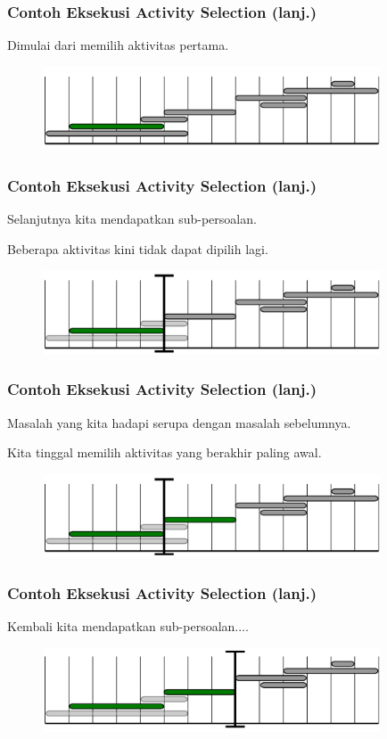 \begin{frame}
  \frametitle{Contoh Eksekusi Activity Selection (lanj.)}
  Dimulai dari memilih aktivitas pertama.
  \begin{figure}
    \includegraphics[width=10cm]{asset/activity-selection-algo-2.pdf}
  \end{figure}
\end{frame}

\begin{frame}
  \frametitle{Contoh Eksekusi Activity Selection (lanj.)}
  Selanjutnya kita mendapatkan sub-persoalan.

  Beberapa aktivitas kini tidak dapat dipilih lagi.
  \begin{figure}
    \includegraphics[width=10cm]{asset/activity-selection-algo-3.pdf}
  \end{figure}
\end{frame}

\begin{frame}
  \frametitle{Contoh Eksekusi Activity Selection (lanj.)}
  Masalah yang kita hadapi serupa dengan masalah sebelumnya.

  Kita tinggal memilih aktivitas yang berakhir paling awal.
  \begin{figure}
    \includegraphics[width=10cm]{asset/activity-selection-algo-4.pdf}
  \end{figure}
\end{frame}

\begin{frame}
  \frametitle{Contoh Eksekusi Activity Selection (lanj.)}
  Kembali kita mendapatkan sub-persoalan....
  \begin{figure}
    \includegraphics[width=10cm]{asset/activity-selection-algo-5.pdf}
  \end{figure}
\end{frame}

